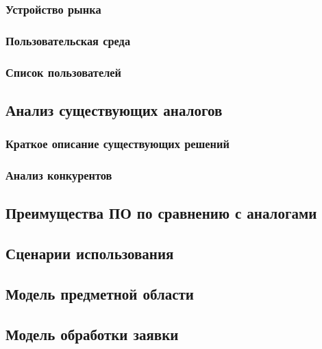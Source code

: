 \documentclass[a4paper,12pt,reqno]{article}
\begin{document}
\subsubsection{Устройство рынка}

\subsubsection{Пользовательская среда}

\subsubsection{Список пользователей} \label{sec: listusers}

\subsection{Анализ существующих аналогов}

\subsubsection{Краткое описание существующих решений}


\subsubsection{Анализ конкурентов}


\subsection{Преимущества ПО по сравнению с аналогами}



\clearpage
\newpage


\setcounter{section}{2}
\setcounter{subsection}{0}


\subsection{Сценарии использования} \label{usecase}

\subsection{Модель предметной области} \label{sec: application}


\subsection{Модель обработки заявки} \label{sec: bpmn_status}
\end{document}
